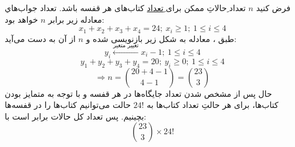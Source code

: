 \p
فرض کنید
$n$
تعداد ِحالاتِ ممکن برای
\underline{ِتعداد}
کتاب‌های هر قفسه‌ باشد.
تعداد جواب‌هاي معادله زير برابر
$n$
خواهد بود:
$$x_1+x_2+x_3+x_4=24;\: x_i\geq 1;\: 1\leq i\leq 4$$
طبق 
،
معادله به شکل زیر بازنویسی شده و 
$n$
از آن به دست می‌آید:
$$ y_i \xleftarrow{\text{تغيير متغير}} x_i - 1;\: 1\leq i\leq 4$$
$$ y_1+y_2+y_3+y_4=20;\: y_i\geq 0;\: 1\leq i\leq 4$$
$$\Rightarrow n = {20+4-1 \choose 4-1} = {23 \choose 3}$$
حال پس از مشخص شدن تعداد جایگاه‌ها در هر قفسه و با توجه به متمایز بودن کتاب‌ها، برای هر حالتِ تعداد کتاب‌ها
 به 
$24!$
حالت می‌توانیم کتاب‌ها را در قفسه‌ها بچینیم.
پس تعداد کل حالات برابر است با:
$${23 \choose 3} \times 24!$$
